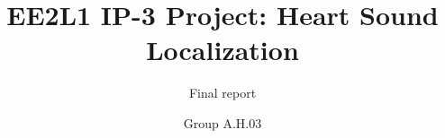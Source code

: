 \documentclass[whitelogo,oneside]{TUD-report2020}
\newcommand{\productName}{Final report}
\begin{document}
 




\frontmatter

\title[tudelft-white]{EE2L1 IP-3 Project: Heart Sound Localization}
\subtitle[tudelft-black]{\productName}
\author[tudelft-white]{Group A.H.03}




% 

% 

\tableofcontents

\mainmatter








\printbibliography


%
 
\appendix

%
%
\end{document}
